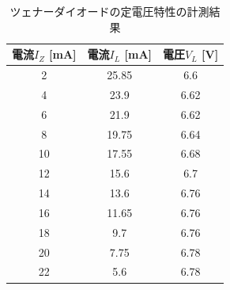 	\begin{table}[hbt]
		\centering
		\caption{ツェナーダイオードの定電圧特性の計測結果}
		\begin{tabular}{|c|c|c|}
		\hline
		電流$I_Z$ [mA] & 電流$I_L$ [mA] & 電圧$V_L$ [V] \\ \hline
		2                        & 25.85           & 6.6            \\ \hline
		4                        & 23.9            & 6.62           \\ \hline
		6                        & 21.9            & 6.62           \\ \hline
		8                        & 19.75           & 6.64           \\ \hline
		10                       & 17.55           & 6.68           \\ \hline
		12                       & 15.6            & 6.7            \\ \hline
		14                       & 13.6            & 6.76           \\ \hline
		16                       & 11.65           & 6.76           \\ \hline
		18                       & 9.7             & 6.76           \\ \hline
		20                       & 7.75            & 6.78           \\ \hline
		22                       & 5.6             & 6.78           \\ \hline
		\end{tabular}
		\label{tab:zenerDiode2_result}
	\end{table}

